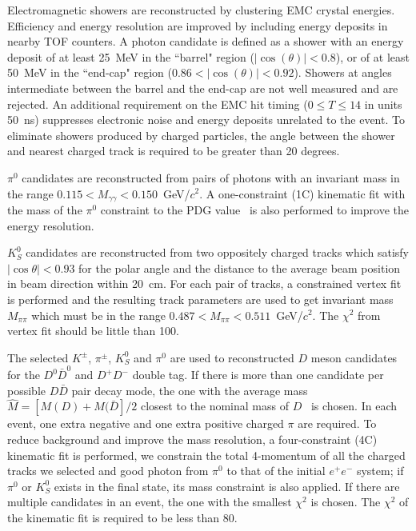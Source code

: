 \documentclass[aps,preprint,superscriptaddress,12pt,tightenlines]{revtex4}
\begin{document}
Electromagnetic showers are reconstructed by clustering EMC
crystal energies. Efficiency and energy resolution are improved by
including energy deposits in nearby TOF counters. A photon
candidate is defined as a shower with an energy deposit of at
least 25~MeV in the ``barrel" region ($|\cos(\theta)|<0.8$), or of
at least 50~MeV in the ``end-cap" region
($0.86<|\cos(\theta)|<0.92$). Showers at angles intermediate
between the barrel and the end-cap are not well measured and are
rejected. An additional requirement on the EMC hit timing ($0\leq
T\leq14$ in units 50~ns) suppresses electronic noise and energy
deposits unrelated to the event. To eliminate showers produced by
charged particles, the angle between the shower and nearest
charged track is required to be greater than 20 degrees.

$\pi^{0}$ candidates are reconstructed from pairs of photons with
an invariant mass in the range
$0.115<M_{\gamma\gamma}<0.150$~GeV/$c^{2}$. A one-constraint (1C)
kinematic fit with the mass of the $\pi^{0}$ constraint to the PDG
value~\cite{PDG} is also performed to improve the energy
resolution.

$K^{0}_{S}$ candidates are reconstructed from two oppositely
charged tracks which satisfy $|\cos\theta|<0.93$ for the polar
angle and the distance to the average beam position in beam
direction within 20~cm. For each pair of tracks, a constrained
vertex fit is performed and the resulting track parameters are
used to get invariant mass $M_{\pi\pi}$ which must be in the range
$0.487< M_{\pi\pi} < 0.511$~GeV/$c^{2}$. The $\chi^{2}$ from
vertex fit should be little than 100.

The selected  $K^{\pm}$, $\pi^{\pm}$, $K^{0}_{S}$ and $\pi^{0}$
are used to reconstructed $D$ meson candidates for the
$D^{0}\bar{D}^{0}$ and $D^{+}D^{-}$ double tag. If there is more
than one candidate per possible $D\bar{D}$ pair decay mode, the
one with the average mass $\hat{M} = [M(D) + M(\bar{D}]/2$ closest
to the nominal mass of $D$~\cite{PDG} is chosen. In each event,
one extra negative and one extra positive charged $\pi$ are
required. To reduce background and improve the mass resolution, a
four-constraint (4C) kinematic fit is performed, we constrain the
total 4-momentum of all the charged tracks we selected and good
photon from $\pi^{0}$ to that of the initial $e^{+}e^{-}$ system;
if $\pi^0$ or $K^{0}_S$ exists in the final state, its mass
constraint is also applied. If there are multiple candidates in an
event, the one with the smallest $\chi^{2}$ is chosen. The
$\chi^{2}$ of the kinematic fit is required to be less than 80.
\end{document}
